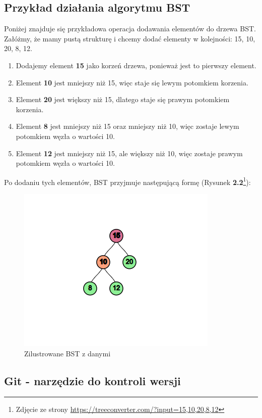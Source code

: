 \subsection{Przykład działania algorytmu BST}

Poniżej znajduje się przykładowa operacja dodawania elementów do drzewa BST. Załóżmy, że mamy pustą strukturę i chcemy dodać elementy w kolejności: 15, 10, 20, 8, 12.

\begin{enumerate}
	\item Dodajemy element \textbf{15} jako korzeń drzewa, ponieważ jest to pierwszy element.
	\item Element \textbf{10} jest mniejszy niż 15, więc staje się lewym potomkiem korzenia.
	\item Element \textbf{20} jest większy niż 15, dlatego staje się prawym potomkiem korzenia.
	\item Element \textbf{8} jest mniejszy niż 15 oraz mniejszy niż 10, więc zostaje lewym potomkiem węzła o wartości 10.
	\item Element \textbf{12} jest mniejszy niż 15, ale większy niż 10, więc zostaje prawym potomkiem węzła o wartości 10.
\end{enumerate}

Po dodaniu tych elementów, BST przyjmuje następującą formę (Rysunek \textbf{2.2}\footnote{Zdjęcie ze strony  \url{https://treeconverter.com/?input=15,10,20,8,12}\cite{www3}}):

\begin{figure}[htb!]
	\centering
	\includegraphics[width=0.7\linewidth]{rys/bstvisul.png}
	\caption{Zilustrowane BST z danymi}
\end{figure}

\subsection{Git - narzędzie do kontroli wersji}


